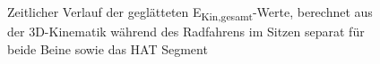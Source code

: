 \documentclass[
  letterpaper,
  DIV=11]{scrartcl}
\begin{document}
\begin{figure}


\caption{\label{fig-PInt_Kinematik_HAT_Ekin_gesamt_sitzen}Zeitlicher
Verlauf der geglätteten E\textsubscript{Kin,gesamt}-Werte, berechnet aus
der 3D-Kinematik während des Radfahrens im Sitzen separat für beide
Beine sowie das HAT Segment}

\end{figure}%
\end{document}
